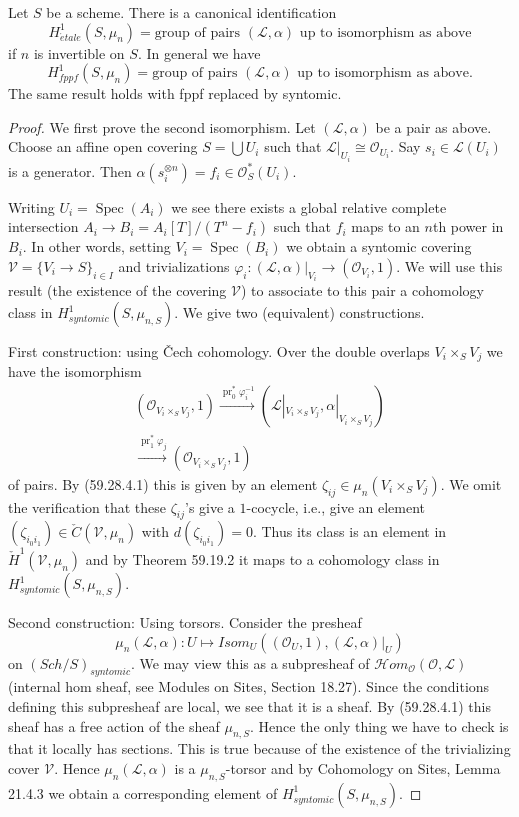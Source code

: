 \begin{lemma}[59.28.5, Tag 040Q]
Let $S$ be a scheme. There is a canonical identification
\[H^1_{\acute etale}(S,\mu_n)=\text{group of pairs $(\mathcal L,\alpha)$ up to isomorphism as above}\]
if $n$ is invertible on $S$. In general we have
\[H^1_{fppf}(S,\mu_n)=\text{group of pairs $(\mathcal L,\alpha)$ up to isomorphism as above}.\]
The same result holds with fppf replaced by syntomic.
\end{lemma}
\begin{proof}
We first prove the second isomorphism. Let $(\mathcal L,\alpha)$ be a pair as above. Choose an affine open covering $S=\bigcup U_i$ such that $\mathcal L|_{U_i}\cong\mathcal O_{U_i}$. Say $s_i\in\mathcal L(U_i)$ is a generator. Then $\alpha(s_i^{\otimes n})=f_i\in\mathcal O_S^*(U_i)$.

Writing $U_i=\operatorname{Spec}(A_i)$ we see there exists a global relative complete intersection $A_i\to B_i=A_i[T]/(T^n-f_i)$ such that $f_i$ maps to an $n$th power in $B_i$. In other words, setting $V_i=\operatorname{Spec}(B_i)$ we obtain a syntomic covering $\mathcal V=\{V_i\to S\}_{i\in I}$ and trivializations $\varphi_i:(\mathcal L,\alpha)|_{V_i}\to(\mathcal O_{V_i},1)$.
We will use this result (the existence of the covering $\mathcal V$) to associate to this pair a cohomology class in $H^1_{syntomic}(S,\mu_{n,S})$. We give two (equivalent) constructions.

First construction: using \v Cech cohomology. Over the double overlaps $V_i\times_S V_j$ we have the isomorphism
\begin{gather*}
(\mathcal O_{V_i\times_S V_j},1)
\xrightarrow{\operatorname{pr}_0^*\varphi_i^{-1}}
(\mathcal L|_{V_i\times_S V_j},\alpha|_{V_i\times_S V_j})\\
\xrightarrow{\operatorname{pr}_1^*\varphi_j}(\mathcal O_{V_i\times_S V_j},1)
\end{gather*}
of pairs. By (59.28.4.1) this is given by an element $\zeta_{ij}\in\mu_n(V_i\times_S V_j)$. We omit the verification that these $\zeta_{ij}$'s give a $1$-cocycle, i.e., give an element $(\zeta_{i_0i_1})\in\check C(\mathcal V,\mu_n)$ with $d(\zeta_{i_0i_1})=0$. Thus its class is an element in $\check H^1(\mathcal V,\mu_n)$ and by Theorem 59.19.2 it maps to a cohomology class in $H^1_{syntomic}(S,\mu_{n,S})$.

Second construction: Using torsors. Consider the presheaf
\[\mu_n(\mathcal L,\alpha):U\longmapsto\mathit{Isom}_U((\mathcal O_U,1),(\mathcal L,\alpha)|_U)\]
on $(\mathit{Sch}/S)_{syntomic}$. We may view this as a subpresheaf of $\mathcal Hom_{\mathcal O}(\mathcal O,\mathcal L)$ (internal hom sheaf, see Modules on Sites, Section 18.27). Since the conditions defining this subpresheaf are local, we see that it is a sheaf. By (59.28.4.1) this sheaf has a free action of the sheaf $\mu_{n,S}$. Hence the only thing we have to check is that it locally has sections. This is true because of the existence of the trivializing cover $\mathcal V$. Hence $\mu_n(\mathcal L,\alpha)$ is a $\mu_{n,S}$-torsor and by Cohomology on Sites, Lemma 21.4.3 we obtain a corresponding element of $H^1_{syntomic}(S,\mu_{n,S})$.


\end{proof}
